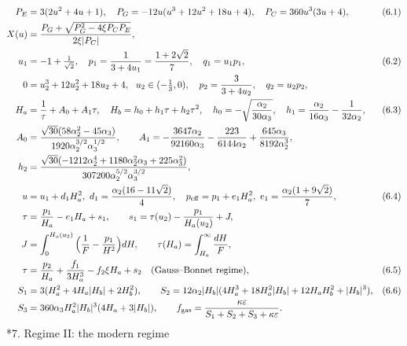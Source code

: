 \documentclass[10pt,a4paper]{article}
\makeatletter
\renewcommand\section{\@startsection{section}{1}{\z@}{-3.5ex \@plus -1ex \@minus -.2ex}{2.3ex \@plus.2ex}{\normalfont\Large\bfseries\raggedright}}
\makeatother
\begin{document}
\begin{align*}
P_E&=3(2u^2+4u+1),\quad P_G=-12u(u^3+12u^2+18u+4),\quad P_C=360u^3(3u+4),&&(6.1) \\
X(u)&=\frac{P_G+\sqrt{P_G^2-4\xi P_CP_E}}{2\xi|P_C|}, \\
u_1&=-1+\tfrac1{\sqrt2},\quad p_1=\frac1{3+4u_1}=\frac{1+2\sqrt2}7,\quad q_1=u_1p_1,&&(6.2) \\
0&=u_2^3+12u_2^2+18u_2+4,\ \ u_2\in(-\tfrac13,0),\quad p_2=\frac3{3+4u_2},\quad q_2=u_2p_2, \\
H_a&=\frac1\tau+A_0+A_1\tau,\quad H_b=h_0+h_1\tau+h_2\tau^2,\quad h_0=-\sqrt{\frac{\alpha_2}{30\alpha_3}},\quad h_1=\frac{\alpha_2}{16\alpha_3}-\frac1{32\alpha_2},&&(6.3) \\
A_0&=\frac{\sqrt{30}(58\alpha_2^2-45\alpha_3)}{1920\alpha_2^{3/2}\alpha_3^{1/2}},\qquad A_1=-\frac{3647\alpha_2}{92160\alpha_3}-\frac{223}{6144\alpha_2}+\frac{645\alpha_3}{8192\alpha_2^3}, \\
h_2&=\frac{\sqrt{30}(-1212\alpha_2^4+1180\alpha_2^2\alpha_3+225\alpha_3^2)}{307200\alpha_2^{5/2}\alpha_3^{3/2}}, \\
u&=u_1+d_1H_a^2,\ d_1=\frac{\alpha_2(16-11\sqrt2)}4,\quad p_{\rm eff}=p_1+e_1H_a^2,\ e_1=\frac{\alpha_2(1+9\sqrt2)}7,&&(6.4) \\
\tau&=\frac{p_1}{H_a}-e_1H_a+s_1,\qquad s_1=\tau(u_2)-\frac{p_1}{H_a(u_2)}+J, \\
J&=\int_0^{H_a(u_2)}\Big(\frac1F-\frac{p_1}{H^2}\Big)dH,\qquad \tau(H_a)=\int_{H_a}^\infty\frac{dH}F, \\
\tau&=\frac{p_2}{H_a}+\frac{f_1}{3H_a^3}-f_2\xi H_a+s_2\quad\text{(Gauss–Bonnet regime)},&&(6.5) \\
S_1&=3(H_a^2+4H_a|H_b|+2H_b^2),\qquad S_2=12\alpha_2|H_b|(4H_a^3+18H_a^2|H_b|+12H_aH_b^2+|H_b|^3),&&(6.6) \\
S_3&=360\alpha_3H_a^2|H_b|^3(4H_a+3|H_b|),\qquad f_{\rm gas}=\frac{\kappa\varepsilon}{S_1+S_2+S_3+\kappa\varepsilon}.
\end{align*}
\section*{7. Regime II: the modern regime}
\end{document}
